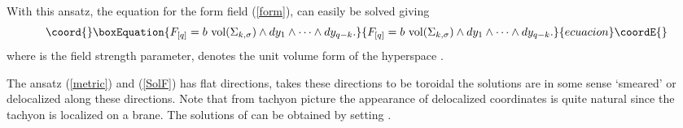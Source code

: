 \documentclass[a4paper,aps,nofootinbib,showpacs,preprint]{revtex4}
\begin{document}
With this ansatz, the equation for the form field (\ref{form}),
can easily be solved giving
\begin{equation}\coord{}\boxEquation{\label{SolF}
F_{[q]} = b  \,\, \mbox{vol}(\Sigma_{k,\sigma}) \wedge dy_1 \wedge
\cdots \wedge dy_{q-k}.
}{F_{[q]} = b  \,\, \mbox{vol}(\Sigma_{k,\sigma}) \wedge dy_1 \wedge
\cdots \wedge dy_{q-k}.
}{ecuacion}\coordE{}\end{equation}
where \coordHE{} is the field strength parameter,
\coordHE{} denotes the unit volume form of
the hyperspace \coordHE{}.

The ansatz (\ref{metric}) and (\ref{SolF}) has \coordHE{} flat
directions, takes these directions to be toroidal the solutions
are in some sense `smeared' or delocalized along these directions.
Note that from tachyon picture the appearance of delocalized
coordinates is quite natural since the tachyon is localized on a
brane. The solutions of \cite{GS02} can be obtained by setting
\coordHE{}.
\end{document}
